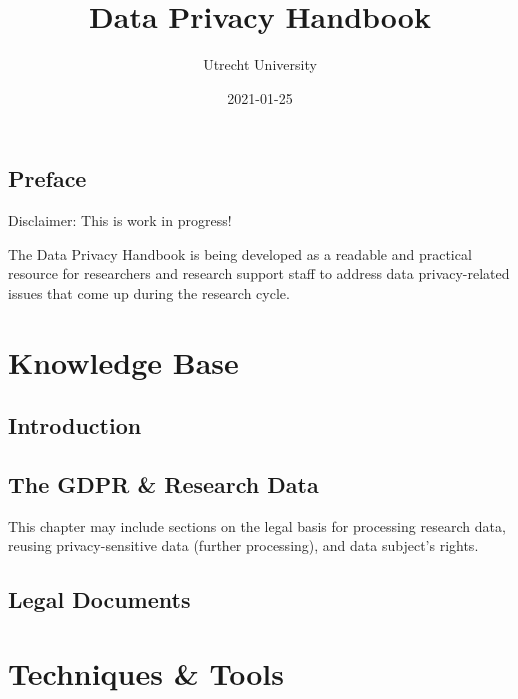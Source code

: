 \documentclass[
]{book}
\title{Data Privacy Handbook}
\author{Utrecht University}
\date{2021-01-25}
\begin{document}
\maketitle

{
\setcounter{tocdepth}{1}
\tableofcontents
}
\hypertarget{preface}{%
\chapter*{Preface}\label{preface}}

Disclaimer: This is work in progress!

The Data Privacy Handbook is being developed as a readable and practical resource for researchers and research support staff to address data privacy-related issues that come up during the research cycle.

\hypertarget{part-knowledge-base}{%
\part{Knowledge Base}\label{part-knowledge-base}}

\hypertarget{introduction}{%
\chapter*{Introduction}\label{introduction}}

\hypertarget{the-gdpr-research-data}{%
\chapter*{The GDPR \& Research Data}\label{the-gdpr-research-data}}

This chapter may include sections on the legal basis for processing research data, reusing privacy-sensitive data (further processing), and data subject's rights.

\hypertarget{legal-documents}{%
\chapter*{Legal Documents}\label{legal-documents}}

\hypertarget{part-techniques-tools}{%
\part{Techniques \& Tools}\label{part-techniques-tools}}
\end{document}
